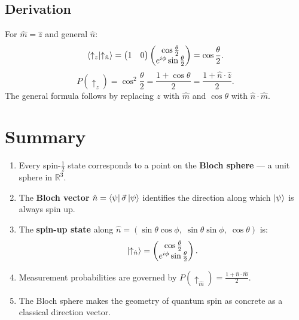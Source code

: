 \documentclass[11pt,a4paper]{article}
\theoremstyle{definition}
\theoremstyle{plain}
\theoremstyle{remark}
\begin{document}
\subsection{Derivation}

For $\hat{m} = \hat{z}$ and general $\hat{n}$:
\[
    \braket{\uparrow_z}{\uparrow_{\hat{n}}} = \begin{pmatrix}1&0\end{pmatrix}\begin{pmatrix}\cos\frac{\theta}{2}\\e^{i\phi}\sin\frac{\theta}{2}\end{pmatrix} = \cos\frac{\theta}{2}.
\]
\[
    P(\uparrow_z) = \cos^2\frac{\theta}{2} = \frac{1 + \cos\theta}{2} = \frac{1 + \hat{n}\cdot\hat{z}}{2}.
\]
The general formula follows by replacing $\hat{z}$ with $\hat{m}$ and $\cos\theta$ with $\hat{n}\cdot\hat{m}$.

\section{Summary}

\begin{enumerate}
    \item Every spin-$\frac{1}{2}$ state corresponds to a point on the \textbf{Bloch sphere} --- a unit sphere in $\mathbb{R}^3$.
    \item The \textbf{Bloch vector} $\hat{n} = \bra{\psi}\vec{\sigma}\ket{\psi}$ identifies the direction along which $\ket{\psi}$ is always spin up.
    \item The \textbf{spin-up state} along $\hat{n} = (\sin\theta\cos\phi,\;\sin\theta\sin\phi,\;\cos\theta)$ is:
    \[
        \ket{\uparrow_{\hat{n}}} = \begin{pmatrix}\cos\frac{\theta}{2}\\e^{i\phi}\sin\frac{\theta}{2}\end{pmatrix}.
    \]
    \item Measurement probabilities are governed by $P(\uparrow_{\hat{m}}) = \frac{1 + \hat{n}\cdot\hat{m}}{2}$.
    \item The Bloch sphere makes the geometry of quantum spin as concrete as a classical direction vector.
\end{enumerate}
\end{document}
